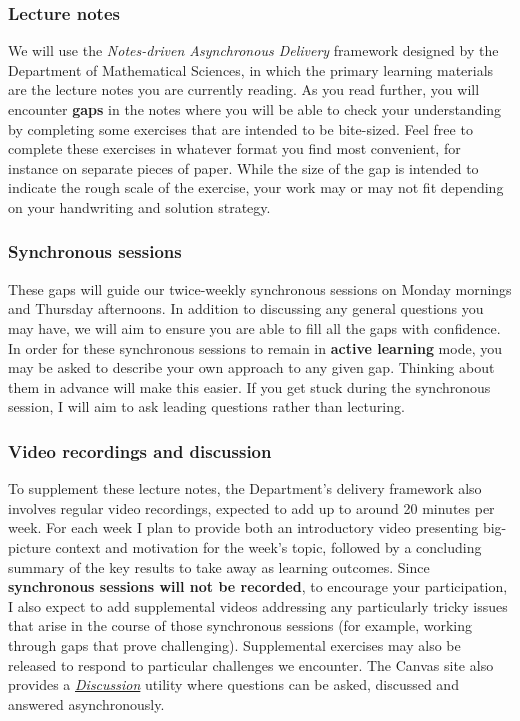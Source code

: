\subsubsection*{Lecture notes}
We will use the \textit{Notes-driven Asynchronous Delivery} framework designed by the Department of Mathematical Sciences, in which the primary learning materials are the lecture notes you are currently reading.
As you read further, you will encounter \textbf{gaps} in the notes where you will be able to check your understanding by completing some exercises that are intended to be bite-sized.
Feel free to complete these exercises in whatever format you find most convenient, for instance on separate pieces of paper.
While the size of the gap is intended to indicate the rough scale of the exercise, your work may or may not fit depending on your handwriting and solution strategy.

\subsubsection*{Synchronous sessions}
These gaps will guide our twice-weekly synchronous sessions on Monday mornings and Thursday afternoons.
In addition to discussing any general questions you may have, we will aim to ensure you are able to fill all the gaps with confidence.
In order for these synchronous sessions to remain in \textbf{active learning} mode, you may be asked to describe your own approach to any given gap.
Thinking about them in advance will make this easier.
If you get stuck during the synchronous session, I will aim to ask leading questions rather than lecturing.

\subsubsection*{Video recordings and discussion}
To supplement these lecture notes, the Department's delivery framework also involves regular video recordings, expected to add up to around 20 minutes per week.
For each week I plan to provide both an introductory video presenting big-picture context and motivation for the week's topic, followed by a concluding summary of the key results to take away as learning outcomes.
Since \textbf{synchronous sessions will not be recorded}, to encourage your participation, I also expect to add supplemental videos addressing any particularly tricky issues that arise in the course of those synchronous sessions (for example, working through gaps that prove challenging).
Supplemental exercises may also be released to respond to particular challenges we encounter.
The Canvas site also provides a \textit{\href{https://liverpool.instructure.com/courses/19478/discussion_topics}{Discussion}} utility where questions can be asked, discussed and answered asynchronously.

